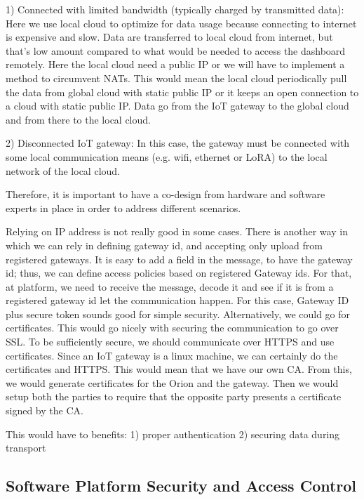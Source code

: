 1) Connected with limited bandwidth (typically charged by transmitted data): Here we use local cloud to optimize for data usage because connecting to internet is expensive and slow. Data are transferred to local cloud from internet, but that's low amount compared to what would be needed to access the dashboard remotely. Here the local cloud need a public IP or we will have to implement a method to circumvent NATs. This would mean the local cloud periodically pull the data from global cloud with static public IP or it keeps an open connection to a cloud with static public IP. Data go from the IoT gateway to the global cloud and from there to the local cloud.

2) Disconnected IoT gateway: In this case, the gateway must be connected with some local communication means (e.g. wifi, ethernet or LoRA) to the local network of the local cloud.

Therefore, it is important to have a co-design from hardware and software experts in place in order to address different scenarios.

Relying on IP address is not really good in some cases. There is another way in which we can rely in defining gateway id, and accepting only upload from registered gateways. It is easy to add a field in the message, to have the gateway id; thus, we can define access policies based on registered Gateway ids.  For that, at platform, we need to receive the message, decode it and see if it is from a registered gateway id let the communication happen. For this case,  Gateway ID plus secure token sounds good for simple security. Alternatively, we could go for certificates. This would go nicely with securing the communication to go over SSL. To be sufficiently secure, we should communicate over HTTPS and use certificates. Since an IoT gateway is a linux machine, we can certainly do the certificates and HTTPS.
This would mean that we have our own CA. From this, we would generate certificates for the Orion and the gateway. Then we would setup both the parties to require that the opposite party presents a certificate signed by the CA.

This would have to benefits:
1) proper authentication
2) securing data during transport

\subsection{Software Platform Security and Access Control}

